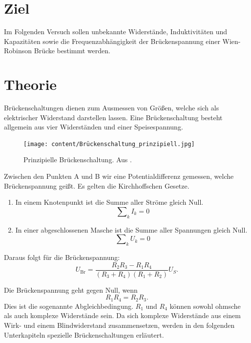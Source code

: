 \section{Ziel}
\label{sec:Ziel}
Im Folgenden Versuch sollen unbekannte Widerstände, Induktivitäten und Kapazitäten sowie die Frequenzabhängigkeit der Brückenspannung einer Wien-Robinson Brücke bestimmt werden.

\section{Theorie}
\label{sec:Theorie}
Brückenschaltungen dienen zum Ausmessen von Größen, welche sich als elektrischer Widerstand darstellen lassen. Eine Brückenschaltung besteht allgemein aus vier Widerständen und einer Speisespannung.

\begin{figure}
  \centering
  \texttt{[image: content/Brückenschaltung\_prinzipiell.jpg]}
  \caption{Prinzipielle Brückenschaltung. Aus \cite{anleitung302}.}
  \label{fig:brückenschaltung}
\end{figure}

Zwischen den Punkten A und B wir eine Potentialdifferenz gemessen, welche Brückenspannung geißt.
Es gelten die Kirchhoffschen Gesetze.
\begin{enumerate}
  \item In einem Knotenpunkt ist die Summe aller Ströme gleich Null.
  \begin{equation}
    \mathrm\sum_{k} I_k = 0
  \end{equation}
  \item In einer abgeschlossenen Masche ist die Summe aller Spannungen gleich Null.
  \begin{equation}
    \mathrm\sum_{k} U_k = 0
  \end{equation}
\end{enumerate}

Daraus folgt für die Brückenspannung:
\begin{equation}
  U_{\mathrm{Br}} = \frac{R_{2}R_3 - R_{1}R_4}{(R_3 + R_4)(R_{1} + R_{2})} U_S .
\end{equation}

Die Brückenspannung geht gegen Null, wenn
\begin{equation}
  R_{1} R_4 = R_{2} R_3 .
\end{equation}
Dies ist die sogenannte Abgleichbedingung.
$R_{1}$ und $R_4$ können sowohl ohmsche als auch komplexe Widerstände sein. Da sich komplexe Widerstände aus einem Wirk- und einem Blindwiderstand  zusammensetzen, werden in den folgenden Unterkapiteln spezielle Brückenschaltungen erläutert.

